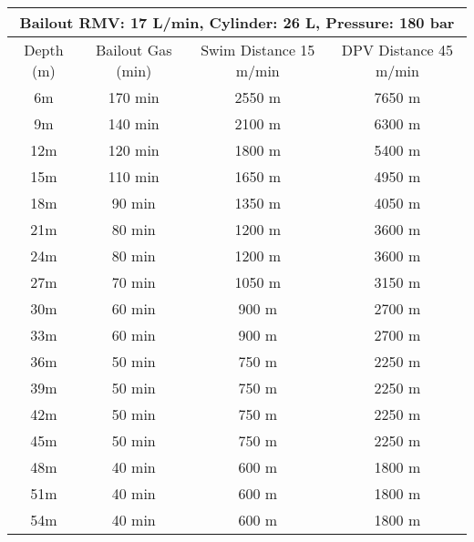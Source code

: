 \documentclass{article}
\begin{document}
\begin{tabular}{|c|c|c|c|}
\hline
\multicolumn{4}{|c|}{Bailout RMV: 17 L/min, Cylinder: 26 L, Pressure: 180 bar} \\ 
\hline
Depth (m) & Bailout Gas (min) & Swim Distance 15 m/min & DPV Distance 45 m/min \\ 
\hline
6m & 170 min & 2550 m & 7650 m \\ 
\hline
9m & 140 min & 2100 m & 6300 m \\ 
\hline
12m & 120 min & 1800 m & 5400 m \\ 
\hline
15m & 110 min & 1650 m & 4950 m \\ 
\hline
18m & 90 min & 1350 m & 4050 m \\ 
\hline
21m & 80 min & 1200 m & 3600 m \\ 
\hline
24m & 80 min & 1200 m & 3600 m \\ 
\hline
27m & 70 min & 1050 m & 3150 m \\ 
\hline
30m & 60 min & 900 m & 2700 m \\ 
\hline
33m & 60 min & 900 m & 2700 m \\ 
\hline
36m & 50 min & 750 m & 2250 m \\ 
\hline
39m & 50 min & 750 m & 2250 m \\ 
\hline
42m & 50 min & 750 m & 2250 m \\ 
\hline
45m & 50 min & 750 m & 2250 m \\ 
\hline
48m & 40 min & 600 m & 1800 m \\ 
\hline
51m & 40 min & 600 m & 1800 m \\ 
\hline
54m & 40 min & 600 m & 1800 m \\ 
\hline
\end{tabular}
\end{document}
